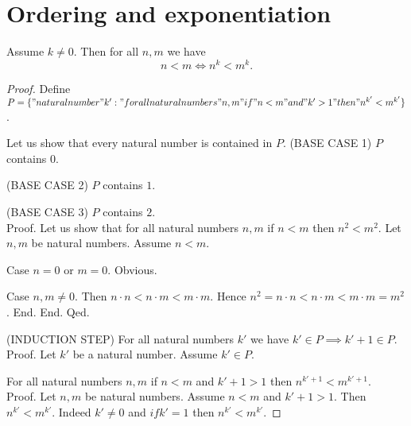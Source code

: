 \documentclass[../../natural-numbers.ftl.tex]{subfiles}
\begin{document}


  \section{Ordering and exponentiation}

  \begin{forthel}
    \begin{proposition}[NN 02 04 770958]
      Assume $k \neq 0$.
      Then for all $n,m$ we have
      $$n < m \iff n^{k} < m^{k}.$$
    \end{proposition}
    \begin{proof}
      Define $P = \{ "natural number" k' : " for all natural numbers" n,m "if" n < m "and" k' > 1 "then" n^{k'} < m^{k'} \}$.

      Let us show that every natural number is contained in $P$.
        (BASE CASE 1) $P$ contains $0$.

        (BASE CASE 2) $P$ contains $1$.

        (BASE CASE 3) $P$ contains $2$. \\
        Proof.
          Let us show that for all natural numbers $n,m$ if $n < m$ then $n^{2} < m^{2}$.
            Let $n,m$ be natural numbers.
            Assume $n < m$.

            Case $n = 0$ or $m = 0$. Obvious.

            Case $n,m \neq 0$.
              Then $n \cdot n < n \cdot m < m \cdot m$.
              Hence $n^{2} = n \cdot n < n \cdot m < m \cdot m = m^{2}$.
            End.
          End.
        Qed.

        (INDUCTION STEP) For all natural numbers $k'$ we have $k' \in P \implies k' + 1 \in P$. \\
        Proof.
          Let $k'$ be a natural number.
          Assume $k' \in P$.

          For all natural numbers $n,m$ if $n < m$ and $k' + 1 > 1$ then $n^{k' + 1} < m^{k' + 1}$. \\
          Proof.
            Let $n,m$ be natural numbers.
            Assume $n < m$ and $k' + 1 > 1$.
            Then $n^{k'} < m^{k'}$.
            Indeed $k' \neq 0$ and $if k' = 1$ then $n^{k'} < m^{k'}$.


\end{proof}
\end{forthel}
\end{document}
